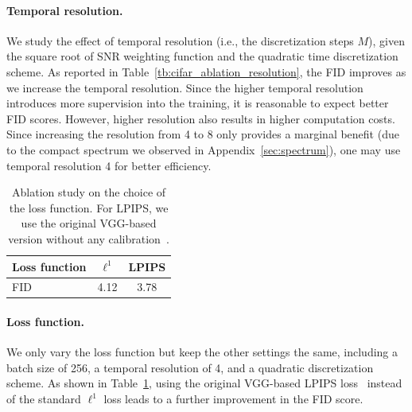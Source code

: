 \paragraph{Temporal resolution.} We study the effect of temporal resolution (i.e., the discretization steps $M$), given the square root of SNR weighting function and the quadratic time discretization scheme. 
As reported in Table~\ref{tb:cifar_ablation_resolution}, the FID improves as we increase the temporal resolution. Since the higher temporal resolution introduces more supervision into the training, it is reasonable to expect better FID scores. However, higher resolution also results in higher computation costs. Since increasing the resolution from 4 to 8 only provides a marginal benefit (due to the compact spectrum we observed in Appendix~\ref{sec:spectrum}), one may use temporal resolution 4 for better efficiency.   

\begin{table}[ht]
\caption{Ablation study on the choice of the loss function. For LPIPS, we use the original VGG-based version without any calibration~\cite{zhang2018unreasonable}.}
\label{tb:cifar_ablation_loss}
\begin{center}
\begin{small}
\begin{tabular}{lcc}
\toprule
Loss function & $\ell^1$ & LPIPS \\
\midrule
FID   & 4.12  & 3.78 \\
\bottomrule
\end{tabular}
\end{small}
\end{center}
\vskip -0.1in
\end{table}
\paragraph{Loss function.} We only vary the loss function but keep the other settings the same, including a batch size of 256, a temporal resolution of 4, and a quadratic discretization scheme.  As shown in Table~\ref{tb:cifar_ablation_loss}, using the original VGG-based LPIPS loss~\cite{zhang2018unreasonable} instead of the standard $\ell^1$ loss leads to a further improvement in the FID score. 






